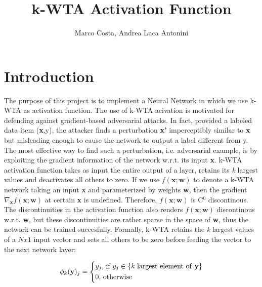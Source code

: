 \documentclass[a4paper]{article}
\title{k-WTA Activation Function}
\author{Marco Costa, Andrea Luca Antonini}
\begin{document}
\maketitle

\section{Introduction}
The purpose of this project is to implement a Neural Network in which we use k-WTA as activation function. \newline
The use of k-WTA acivation is motivated for defending against gradient-based adversarial attacks. In fact, provided a labeled data item (\textbf{x},y), the attacker finds a perturbation \textbf{x'} imperceptibly similar to \textbf{x} but misleading enough to cause the network to output a label different from y. The most effective way to find such a perturbation, i.e. adversarial example, is by exploiting the gradient information of the network w.r.t. its input \textbf{x}. \newline
k-WTA activation function takes as input the entire output of a layer, retains its \textit{k} largest values and deactivates all others to zero. If we use $f(\textbf{x};\textbf{w})$ to denote a k-WTA network taking an input \textbf{x} and parameterized by weights \textbf{w}, then the gradient $\nabla_{\textbf{x}}f(\textbf{x};\textbf{w})$ at certain \textbf{x} is undefined. Therefore, $f(\textbf{x};\textbf{w})$ is C$^0$ discontinous. The discontinuities in the activation function also renders $f(\textbf{x};\textbf{w})$ discontinous w.r.t. \textbf{w}, but these discontinuities are rather sparse in the space of \textbf{w}, thus the network can be trained succesfully. \newline
Formally, k-WTA retains the \textit{k} largest values of a $Nx1$ input vector and sets all others to be zero before feeding the vector to the next network layer:

\begin{equation}
\phi_{k}(\textbf{y})_{j} = 
\begin{cases*}
y_{j}\textrm{, if }y_{j} \in\{\textrm{\textit{k} largest element of \textbf{y}}\} \\
0 \textrm{, otherwise}
\end{cases*}
\end{equation}
\end{document}
